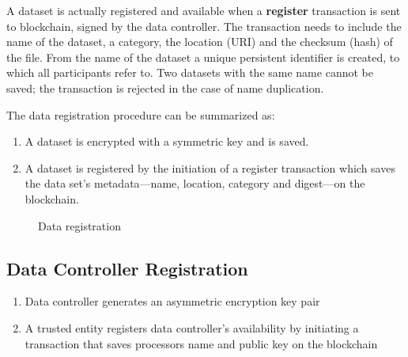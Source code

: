 A dataset is actually registered and available when a \textbf{register} transaction is sent to blockchain, signed by the data controller. The transaction needs to include the name of the dataset, a category, the location (URI) and the checksum (hash) of the file. From the name of the dataset a unique persistent identifier is created, to which all participants refer to. Two datasets with the same name cannot be saved; the transaction is rejected in the case of name duplication.

The data registration procedure can be summarized as:

\begin{enumerate}
  \item A dataset is encrypted with a symmetric key and is saved.
  \item A dataset is registered by the initiation of a register transaction which saves the data set's metadata---name, location, category and digest---on the blockchain.
\end{enumerate}

\begin{figure}[ht!]
  \caption{Data registration}
  \label{fig:arc:reg}
\end{figure}

\subsection{Data Controller Registration}
\label{solution:flow:con_reg}

\begin{enumerate}
  \item Data controller generates an asymmetric encryption key pair
  \item A trusted entity registers data controller's availability by initiating a transaction that saves processors name and public key on the blockchain
\end{enumerate}

